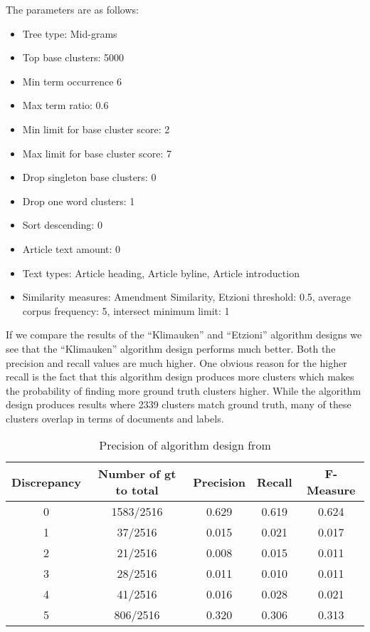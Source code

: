 The parameters are as follows:
\begin{itemize}
  \item Tree type: Mid-grams
  \item Top base clusters: 5000
  \item Min term occurrence 6
  \item Max term ratio: 0.6
  \item Min limit for base cluster score: 2
  \item Max limit for base cluster score: 7
  \item Drop singleton base clusters: 0
  \item Drop one word clusters: 1
  \item Sort descending: 0
  \item Article text amount: 0
  \item Text types: Article heading, Article byline, Article introduction
  \item Similarity measures: Amendment Similarity, Etzioni threshold: 0.5, average corpus frequency: 5, intersect minimum limit: 1
\end{itemize}

If we compare the results of the ``Klimauken'' and ``Etzioni'' algorithm designs we see that the ``Klimauken'' algorithm design performs much better. Both the precision and recall values are much higher. One obvious reason for the higher recall is the fact that this algorithm design produces more clusters which makes the probability of finding more ground truth clusters higher. While the algorithm design produces results where 2339 clusters match ground truth, many of these clusters overlap in terms of documents and labels.

\begin{table}[H]
\begin{center}
\begin{tabular}{|c|c|ccc|}
\hline
Discrepancy & Number of gt to total & Precision & Recall & F-Measure\\ 
\hline
0&   1583/2516&   0.629&   0.619 & 0.624\\ 
1&   37/2516&   0.015&   0.021&    0.017\\ 
2&   21/2516&   0.008&   0.015&    0.011\\ 
3&   28/2516&   0.011&   0.010&    0.011\\ 
4&   41/2516&   0.016&   0.028&    0.021\\ 
5&   806/2516&    0.320&   0.306&    0.313\\ 
\hline
\end{tabular}
\end{center}
\caption{Precision of algorithm design from \citeauthor{Moe2014compact}}
\label{tab:klimaukenparametersgroundtruth}
\end{table}

